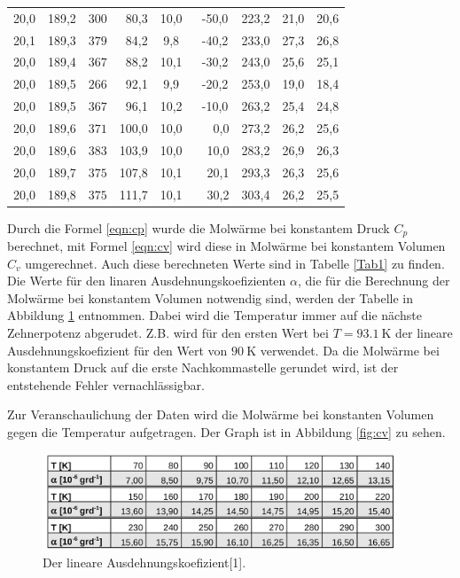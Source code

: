 \begin{table}
\begin{tabular}{S[table-format=2.1] S S S[table-format=2.1] S S S S S}
          {20,0 } & {189,2}  & {$300$} & {~80,3} & 10,0 & {~-50,0} & 223,2 & {21,0} & {20,6} \\
          {20,1 } & {189,3}  & {$379$} & {~84,2} &  9,8 & {~-40,2} & 233,0 & {27,3} & {26,8} \\
          {20,0 } & {189,4}  & {$367$} & {~88,2} & 10,1 & {~-30,2} & 243,0 & {25,6} & {25,1} \\
          {20,0 } & {189,5}  & {$266$} & {~92,1} &  9,9 & {~-20,2} & 253,0 & {19,0} & {18,4} \\
          {20,0 } & {189,5}  & {$367$} & {~96,1} & 10,2 & {~-10,0} & 263,2 & {25,4} & {24,8} \\
          {20,0 } & {189,6}  & {$371$} & {100,0} & 10,0 & {~~~0,0} & 273,2 & {26,2} & {25,6} \\
          {20,0 } & {189,6}  & {$383$} & {103,9} & 10,0 & {~~10,0} & 283,2 & {26,9} & {26,3} \\
          {20,0 } & {189,7}  & {$375$} & {107,8} & 10,1 & {~~20,1} & 293,3 & {26,3} & {25,6} \\
          {20,0 } & {189,8}  & {$375$} & {111,7} & 10,1 & {~~30,2} & 303,4 & {26,2} & {25,5} \\
      \bottomrule
    \end{tabular}
\end{table}
\FloatBarrier

Durch die Formel \ref{eqn:cp} wurde die Molwärme bei konstantem Druck $C_{\si{p}}$ berechnet, mit Formel 
\ref{eqn:cv} wird diese in Molwärme bei konstantem Volumen $C_{\si{v}}$ umgerechnet. Auch diese berechneten 
Werte sind in Tabelle \ref{Tab1} zu finden. Die Werte für den 
linaren Ausdehnungskoefizienten $\alpha$, die für die Berechnung der Molwärme bei konstantem Volumen notwendig 
sind, werden der Tabelle in Abbildung \ref{fig:a} entnommen. Dabei wird die 
Temperatur immer auf die nächste Zehnerpotenz abgerudet. Z.B. wird für den ersten Wert bei 
$T=\SI{93,1}{\kelvin}$ der lineare Ausdehnungskoefizient für den Wert von $\SI{90}{\kelvin}$ verwendet. 
Da die Molwärme bei konstantem Druck auf die erste Nachkommastelle gerundet wird, ist der entstehende 
Fehler vernachlässigbar.

Zur Veranschaulichung der Daten wird die Molwärme bei konstanten Volumen gegen die Temperatur aufgetragen. 
Der Graph ist in Abbildung \ref{fig:cv} zu sehen. 

\begin{figure}
  \centering
  \includegraphics[width=0.95\textwidth]{alpha.png}
  \caption{Der lineare Ausdehnungskoefizient[1].}
  \label{fig:a}
\end{figure}

